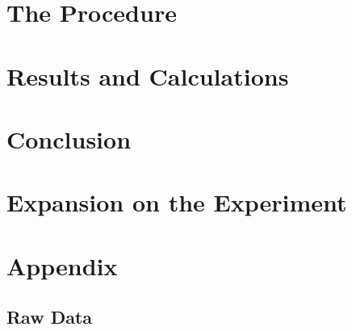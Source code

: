 \documentclass[12pt]{article}
\begin{document}
\section{The Procedure}



\section{Results and Calculations}



\section{Conclusion}



\section{Expansion on the Experiment}




\newpage







\newpage

\section*{Appendix}

\subsection*{Raw Data}
\end{document}
